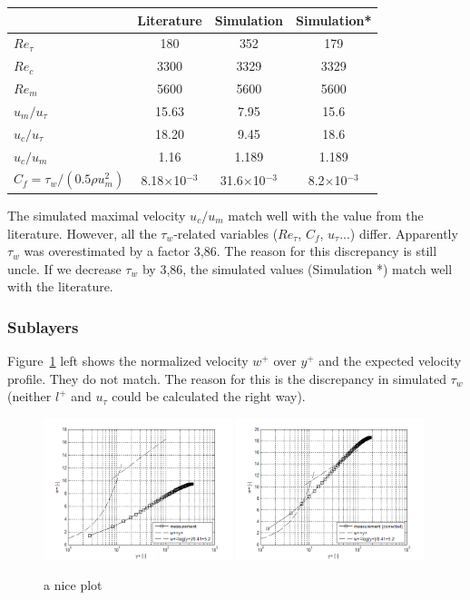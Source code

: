 \documentclass[11pt,a4paper]{article}
\begin{document}
\begin{center}
\begin{tabular}{|l|c|c|c|}
\hline
 & Literature & Simulation & Simulation* \\\hline
$Re_\tau$ & 180 & 352 & 179\\\hline
$Re_c$ & 3300 & 3329 & 3329 \\\hline
$Re_m$ & 5600 & 5600 & 5600\\\hline
$u_m/u_\tau$ & 15.63 & 7.95 & 15.6\\\hline
$u_c/u_\tau$ & 18.20 & 9.45 & 18.6\\\hline
$u_c/u_m$ & 1.16 & 1.189 & 1.189\\\hline
$C_f = \tau_w / (0.5 \rho u_m^2)$ & 8.18$\times$10$^{-3}$ & 31.6$\times$10$^{-3}$ & 8.2$\times$10$^{-3}$\\\hline
\end{tabular}
\end{center}

\noindent The simulated maximal velocity $u_c/u_m$ match well with the value from the literature. However, all the $\tau_w$-related variables ($Re_\tau$, $C_f$, $u_\tau$...) differ. Apparently $\tau_w$  was overestimated by a factor 3,86. The reason for this discrepancy is still uncle. If we decrease $\tau_w$ by 3,86, the simulated values (Simulation *) match well with the literature.

\newpage
\subsubsection{Sublayers}
Figure~\ref{fig:sublayers} left shows the normalized velocity $w^+$  over $y^+$ and the expected velocity profile. They do not match. The reason for this is the discrepancy in simulated $\tau_w$ (neither $l^+$ and $u_{\tau}$ could be calculated the right way).


\begin{figure}[h]
    \centering
    \includegraphics[width=0.49\textwidth]{wy1}
    \includegraphics[width=0.49\textwidth]{wy2}
    \caption{a nice plot}
    \label{fig:sublayers}
\end{figure}
\end{document}
